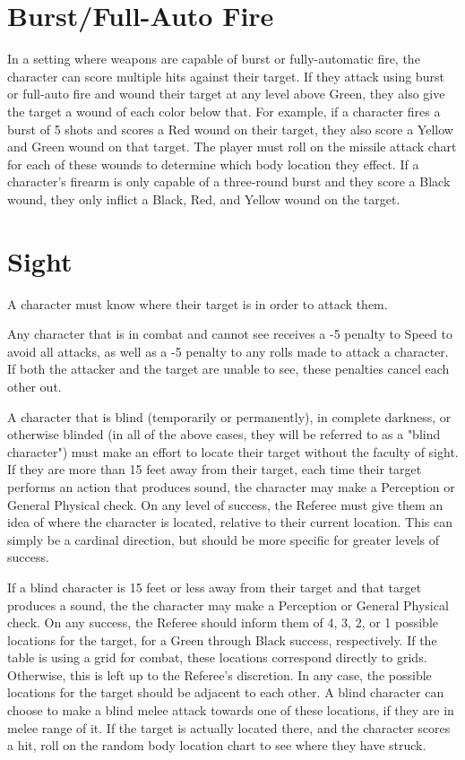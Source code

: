 \documentclass[oneside]{book}
\begin{document}
\begin{multicols}{2}
\section{Burst/Full-Auto Fire}
In a setting where weapons are capable of burst or fully-automatic fire, the character can score multiple hits against their target. If they attack using burst or full-auto fire and wound their target at any level above Green, they also give the target a wound of each color below that. For example, if a character fires a burst of 5 shots and scores a Red wound on their target, they also score a Yellow and Green wound on that target. The player must roll on the missile attack chart for each of these wounds to determine which body location they effect. If a character's firearm is only capable of a three-round burst and they score a Black wound, they only inflict a Black, Red, and Yellow wound on the target. 

\section{Sight}
A character must know where their target is in order to attack them. 

Any character that is in combat and cannot see receives a -5 penalty to Speed to avoid all attacks, as well as a -5 penalty to any rolls made to attack a character. If both the attacker and the target are unable to see, these penalties cancel each other out. 

A character that is blind (temporarily or permanently), in complete darkness, or otherwise blinded (in all of the above cases, they will be referred to as a "blind character") must make an effort to locate their target without the faculty of sight. If they are more than 15 feet away from their target, each time their target performs an action that produces sound, the character may make a Perception or General Physical check. On any level of success, the Referee must give them an idea of where the character is located, relative to their current location. This can simply be a cardinal direction, but should be more specific for greater levels of success. 

If a blind character is 15 feet or less away from their target and that target produces a sound, the the character may make a Perception or General Physical check. On any success, the Referee should inform them of 4, 3, 2, or 1 possible locations for the target, for a Green through Black success, respectively. If the table is using a grid for combat, these locations correspond directly to grids. Otherwise, this is left up to the Referee's discretion. In any case, the possible locations for the target should be adjacent to each other. A blind character can choose to make a blind melee attack towards one of these locations, if they are in melee range of it. If the target is actually located there, and the character scores a hit, roll on the random body location chart to see where they have struck. 


\end{multicols}
\end{document}
